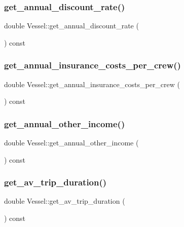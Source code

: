 \subsubsection{\texorpdfstring{get\_annual\_discount\_rate()}{get\_annual\_discount\_rate()}}
{\footnotesize\ttfamily double Vessel\+::get\+\_\+annual\+\_\+discount\+\_\+rate (\begin{DoxyParamCaption}{ }\end{DoxyParamCaption}) const}

\mbox{\label{class_vessel_a122bbbc27f0ce1446a4e374e0bcc56dc}} 
\subsubsection{\texorpdfstring{get\_annual\_insurance\_costs\_per\_crew()}{get\_annual\_insurance\_costs\_per\_crew()}}
{\footnotesize\ttfamily double Vessel\+::get\+\_\+annual\+\_\+insurance\+\_\+costs\+\_\+per\+\_\+crew (\begin{DoxyParamCaption}{ }\end{DoxyParamCaption}) const}

\mbox{\label{class_vessel_a2cbec88165d6b72b722eada0ee09c8c9}} 
\subsubsection{\texorpdfstring{get\_annual\_other\_income()}{get\_annual\_other\_income()}}
{\footnotesize\ttfamily double Vessel\+::get\+\_\+annual\+\_\+other\+\_\+income (\begin{DoxyParamCaption}{ }\end{DoxyParamCaption}) const}

\mbox{\label{class_vessel_ab046eb6fb13d2d1c223d8716b0f63cee}} 
\subsubsection{\texorpdfstring{get\_av\_trip\_duration()}{get\_av\_trip\_duration()}}
{\footnotesize\ttfamily double Vessel\+::get\+\_\+av\+\_\+trip\+\_\+duration (\begin{DoxyParamCaption}{ }\end{DoxyParamCaption}) const}

